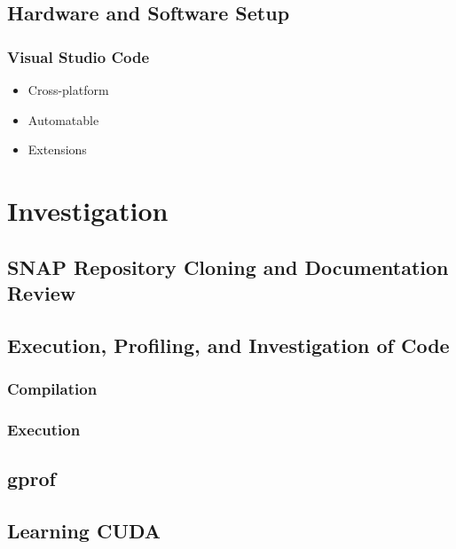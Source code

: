 \documentclass[conference]{IEEEtran}
\begin{document}
\subsection{Hardware and Software Setup}

\subsubsection{Visual Studio Code}
\begin{itemize}
    \item Cross-platform
    \item Automatable
    \item Extensions
\end{itemize}



\section{Investigation}

\subsection{SNAP Repository Cloning and Documentation Review}


\subsection{Execution, Profiling, and Investigation of Code}

\subsubsection{Compilation}


\subsubsection{Execution}


\subsection{gprof}


\subsection{Learning CUDA}
\end{document}
